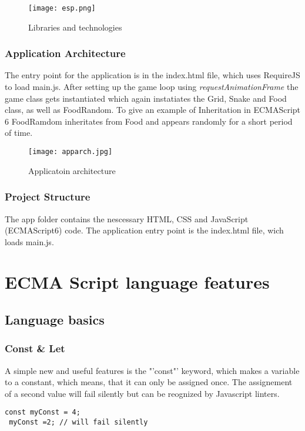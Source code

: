 \documentclass{bioinfo}
\begin{document}
\begin{figure}[!tpb]%
\centerline{\texttt{[image: esp.png]}}
\caption{Libraries and technologies}\label{fig:01}
\end{figure}


\subsubsection{Application Architecture}
The entry point for the application is in the index.html file, which uses RequireJS to load main.js. After setting up the game 
loop using \textit{requestAnimationFrame} the game class gets instantiated which again instatiates the Grid, Snake and Food class,
as well as FoodRandom. To give an example of Inheritation in ECMAScript 6 FoodRamdom inheritates from Food and appears randomly for
a short period of time.
\begin{figure}[!tpb]%
\centerline{\texttt{[image: apparch.jpg]}}
\caption{Applicatoin architecture}\label{fig:02}
\end{figure}
\subsubsection{Project Structure} 
The app folder contains the nescessary HTML, CSS and JavaScript (ECMAScript6) code. The application entry point is the index.html file, wich loads main.js.

\section{ECMA Script language features}

\subsection{Language basics}

\subsubsection{Const \& Let}
A simple new and useful features is the "'const"' keyword, which makes a variable to a constant, which means, 
that it can only be assigned once. The assignement of a second value will fail silently but can be reognized by
Javascript linters.
\begin{lstlisting}[caption= My Javascript Example]
const myConst = 4;
 myConst =2; // will fail silently
\end{lstlisting}
\end{document}
